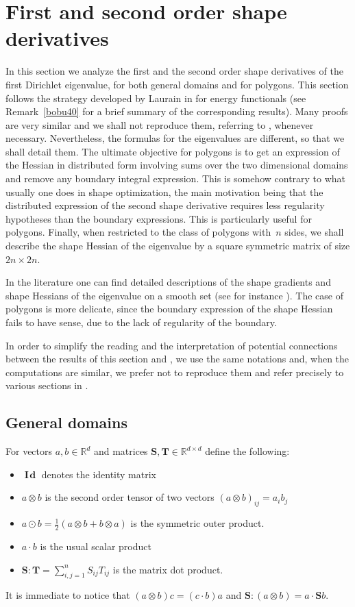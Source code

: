 \documentclass[JEP,XML,SOM,Unicode,ThmDefs,NoFloatCountersInSection,published]{cedram}
\theoremstyle{plain}
\theoremstyle{definition}
\newcommand{\bo}[1]{{\boldsymbol#1}}
\newcommand{\Id}{\operatorname{{\bo I\!\bo d}}}
\let\Bbb\mathbb
\begin{document}
\section{First and second order shape derivatives}\label{bobu200.s2}
In this section we analyze the first and the second order shape derivatives of the first Dirichlet eigenvalue, for both general domains and for polygons. This section follows the strategy developed by Laurain in \cite{laurain2ndDeriv} for energy functionals (see Remark~\ref{bobu40} for a brief summary of the corresponding results). Many proofs are very similar and we shall not reproduce them, referring to \cite{laurain2ndDeriv}, whenever necessary. Nevertheless, the formulas for the eigenvalues are different, so that we shall detail them. The ultimate objective for polygons is to get an expression of the Hessian in distributed form involving sums over the two dimensional domains and remove any boundary integral expression. This is somehow contrary to what usually one does in shape optimization, the main motivation being that the distributed expression of the second shape derivative requires less regularity hypotheses than the boundary expressions. This is particularly useful for polygons. Finally, when restricted to the class of polygons with~$n$ sides, we shall describe the shape Hessian of the eigenvalue by a square symmetric matrix of size $2n\times 2n$.

In the literature one can find detailed descriptions of the shape gradients and shape Hessians of the eigenvalue on a smooth set (see for instance \cite{henrot-pierre-english, HPR04, LNM16,DL19}). The case of polygons is more delicate, since the boundary expression of the shape Hessian fails to have sense, due to the lack of regularity of the boundary.

In order to simplify the reading and the interpretation of potential connections between the results of this section and \cite{laurain2ndDeriv}, we use the same notations and, when the computations are similar, we prefer not to reproduce them and refer precisely to various sections in \cite{laurain2ndDeriv}.
\subsection{General domains}
For vectors $a,b \in \Bbb{R}^d$ and matrices $\bo S, \bo T\in \Bbb{R}^{d\times d}$ define the following:
\begin{itemize}
\item $\Id$ denotes the identity matrix
\item $a \otimes b$ is the second order tensor of two vectors $(a\otimes b)_{ij} = a_ib_j$
\item $a\odot b = \frac{1}{2} (a\otimes b+b\otimes a)$ is the symmetric outer product.
\item $a \cdot b$ is the usual scalar product
\item $\bo S : \bo T = \sum_{i,j=1}^n S_{ij}T_{ij}$ is the matrix dot product.
\end{itemize}
It is immediate to notice that $(a\otimes b)c = (c\cdot b)a$ and $\bo S: (a\otimes b) = a \cdot \bo S b$.
\end{document}
